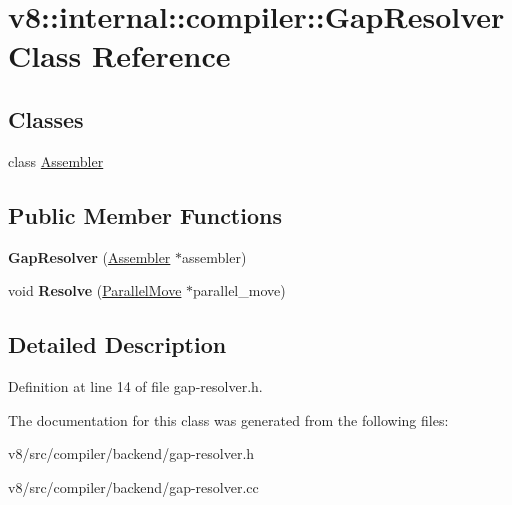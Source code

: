 \hypertarget{classv8_1_1internal_1_1compiler_1_1GapResolver}{}\section{v8\+:\+:internal\+:\+:compiler\+:\+:Gap\+Resolver Class Reference}
\label{classv8_1_1internal_1_1compiler_1_1GapResolver}
\subsection*{Classes}
\begin{DoxyCompactItemize}
\item 
class \mbox{\hyperlink{classv8_1_1internal_1_1compiler_1_1GapResolver_1_1Assembler}{Assembler}}
\end{DoxyCompactItemize}
\subsection*{Public Member Functions}
\begin{DoxyCompactItemize}
\item 
\mbox{\label{classv8_1_1internal_1_1compiler_1_1GapResolver_a7ff2dc278d86e6eb68c34551d4d90306}} 
{\bfseries Gap\+Resolver} (\mbox{\hyperlink{classv8_1_1internal_1_1compiler_1_1GapResolver_1_1Assembler}{Assembler}} $\ast$assembler)
\item 
\mbox{\label{classv8_1_1internal_1_1compiler_1_1GapResolver_ac1a0a4967cb5b68dd9baab80e5c40f5c}} 
void {\bfseries Resolve} (\mbox{\hyperlink{classv8_1_1internal_1_1compiler_1_1ParallelMove}{Parallel\+Move}} $\ast$parallel\+\_\+move)
\end{DoxyCompactItemize}


\subsection{Detailed Description}


Definition at line 14 of file gap-\/resolver.\+h.



The documentation for this class was generated from the following files\+:\begin{DoxyCompactItemize}
\item 
v8/src/compiler/backend/gap-\/resolver.\+h\item 
v8/src/compiler/backend/gap-\/resolver.\+cc\end{DoxyCompactItemize}
